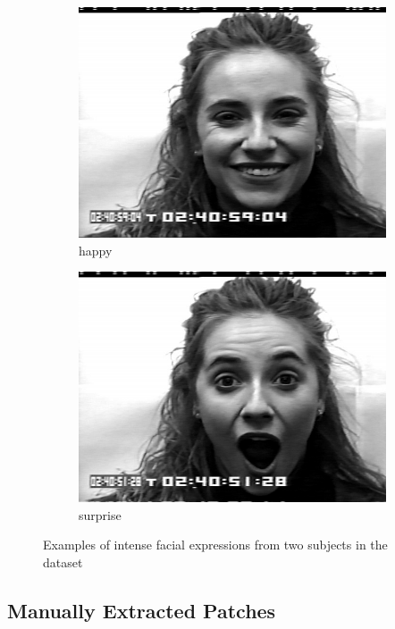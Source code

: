 \begin{figure}
\begin{subfigure}[b]{0.22\textwidth}
		\includegraphics[width=\textwidth]{./img/dataset/happy.png}
		\caption{happy}
		\label{fig:dataset:happy}
	\end{subfigure}
	\begin{subfigure}[b]{0.22\textwidth}
		\includegraphics[width=\textwidth]{./img/dataset/surprise.png}
		\caption{surprise}
		\label{fig:dataset:surprise}
	\end{subfigure}
    \caption[Examples of intense facial expressions]{Examples of intense facial expressions from two subjects in the dataset}
    \label{fig:dataset images}
\end{figure}

\subsection{Manually Extracted Patches}\label{sec:data:manual}

